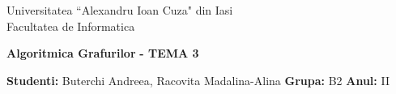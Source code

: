 \documentclass{article}
\begin{document}
\begin{titlepage}

\begin{center}
Universitatea ``Alexandru Ioan Cuza" din Iasi\\
Facultatea de Informatica\\
\end{center}

\vspace{80mm}
 
\begin{center}
\begin{Huge}
\textbf{Algoritmica Grafurilor}
\textbf{ - TEMA 3}
\end{Huge}
\end{center}
 
\vspace{60mm}
\begin{center}
\begin{Large}
\textbf{Studenti:} Buterchi Andreea, Racovita Madalina-Alina
\newline
\textbf{Grupa:} B2
\textbf{Anul:} II
\end{Large}
\end{center}
\vfill

\end{titlepage}
\end{document}
